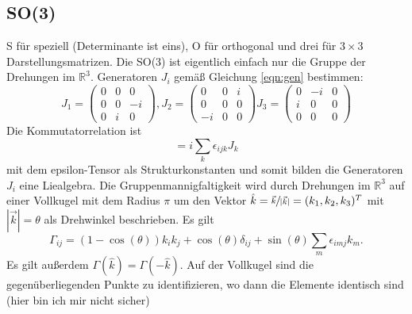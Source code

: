 \documentclass[
  captions=tableheading,  %
  titlepage=firstiscover, %
]{scrartcl}
\begin{document}
\subsection{SO(3)}
S für speziell (Determinante ist eins), O für orthogonal und drei für $3 \times 3$ Darstellungsmatrizen.
Die SO(3) ist eigentlich einfach nur  die Gruppe der Drehungen im $\mathbb{R}^3$.
Generatoren $J_i$ gemäß Gleichung \eqref{eqn:gen} bestimmen:
\begin{equation*}
  J_1 = 
  \begin{pmatrix}
    0 & 0 & 0   \\
    0 & 0 & -i  \\
    0 & i & 0 
  \end{pmatrix}, 
  J_2 = 
  \begin{pmatrix}
    0 & 0   & i \\
    0 & 0   & 0 \\
    -i & 0  & 0 
  \end{pmatrix}
  J_3= 
  \begin{pmatrix}
    0 & -i  & 0 \\
    i & 0   & 0 \\
    0 & 0   & 0 
  \end{pmatrix}
\end{equation*}
Die Kommutatorrelation ist 
\begin{equation*}
  [J_i, J_j] = i \sum_k \epsilon_{ijk} J_k 
\end{equation*}
mit dem epsilon-Tensor als Strukturkonstanten und somit bilden die Generatoren $J_i$ eine Liealgebra.
Die Gruppenmannigfaltigkeit wird durch  Drehungen im $\mathbb{R}^3$ auf einer Vollkugel mit dem Radius $\pi$ 
um den Vektor $\hat{k} = \sfrac{\vec{k}}{|\vec{k}|} = (k_1, k_2, k_3)^T$ mit $|\vec{k}| = \theta$ als
Drehwinkel beschrieben.
Es gilt 
\begin{equation*}
  \Gamma_{ij} = (1-\cos(\theta)) k_i k_j + \cos(\theta) \delta_{ij} + \sin(\theta) \sum_m \epsilon_{imj}k_m.
\end{equation*}
Es gilt außerdem $\Gamma(\hat{k}) = \Gamma(-\hat{k})$.
Auf der Vollkugel sind die gegenüberliegenden Punkte zu identifizieren,
wo dann die Elemente identisch sind ({\color{red}hier bin ich mir nicht sicher})
\end{document}
